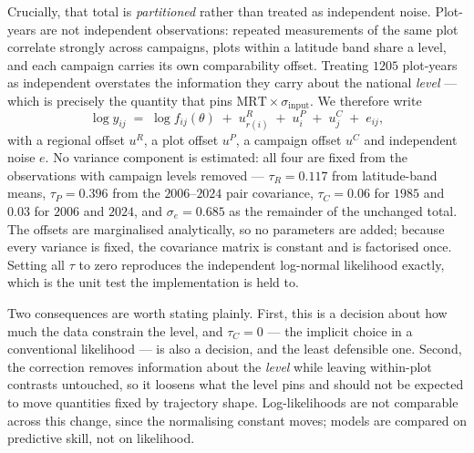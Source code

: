 \documentclass[11pt]{article}
\begin{document}
Crucially, that total is \emph{partitioned} rather than treated as independent
noise. Plot-years are not independent observations: repeated measurements of the
same plot correlate strongly across campaigns, plots within a latitude band share
a level, and each campaign carries its own comparability offset. Treating $1205$
plot-years as independent overstates the information they carry about the
national \emph{level} --- which is precisely the quantity that pins
$\mathrm{MRT}\times\sigma_{\mathrm{input}}$. We therefore write
\[
  \log y_{ij} \;=\; \log f_{ij}(\theta) \;+\; u^{R}_{r(i)} \;+\; u^{P}_{i} \;+\; u^{C}_{j} \;+\; e_{ij},
\]
with a regional offset $u^R$, a plot offset $u^P$, a campaign offset $u^C$ and
independent noise $e$. No variance component is estimated: all four are fixed
from the observations with campaign levels removed --- $\tau_R = 0.117$ from
latitude-band means, $\tau_P = 0.396$ from the $2006$--$2024$ pair covariance,
$\tau_C = 0.06$ for $1985$ and $0.03$ for $2006$ and $2024$, and
$\sigma_e = 0.685$ as the remainder of the unchanged total. The offsets are
marginalised analytically, so no parameters are added; because every variance is
fixed, the covariance matrix is constant and is factorised once. Setting all
$\tau$ to zero reproduces the independent log-normal likelihood exactly, which is
the unit test the implementation is held to.

Two consequences are worth stating plainly. First, this is a decision about how
much the data constrain the level, and $\tau_C = 0$ --- the implicit choice in a
conventional likelihood --- is also a decision, and the least defensible one.
Second, the correction removes information about the \emph{level} while leaving
within-plot contrasts untouched, so it loosens what the level pins and should not
be expected to move quantities fixed by trajectory shape. Log-likelihoods are not
comparable across this change, since the normalising constant moves; models are
compared on predictive skill, not on likelihood.
\end{document}

